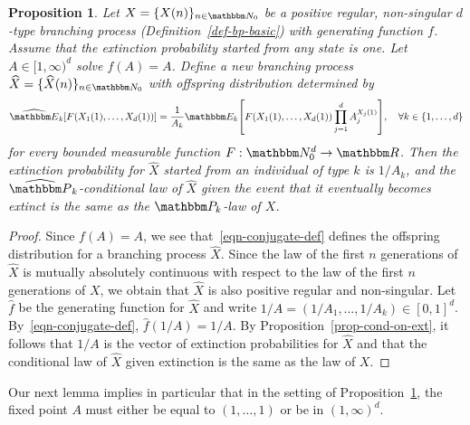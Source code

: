 \documentclass[11pt]{article}
\theoremstyle{plain}
\newtheorem{prop}[thm]{Proposition}
\theoremstyle{definition}
\numberwithin{equation}{section}
\newcommand{\eqb}{\begin{equation}}
\newcommand{\eqe}{\end{equation}}
\newcommand{\BB}{\mathbbm}
\newcommand{\wh}{\widehat}
\let\originalleft\left
\let\originalright\right
\renewcommand{\left}{\mathopen{}\mathclose\bgroup\originalleft}
\renewcommand{\right}{\aftergroup\egroup\originalright}
\begin{document}
\begin{prop} \label{prop-conjugate}
Let $X = \{X(n) \}_{n\in\BB N_0}$ be a positive regular, non-singular $d$-type branching process (Definition~\ref{def-bp-basic}) with generating function $f$. Assume that the extinction probability started from any state is one. 
Let $A \in [1,\infty)^d$ solve $f(A) = A$. Define a new branching process $\wh X = \{\wh X(n)  \}_{n\in\BB N_0}$ with offspring distribution determined by
\eqb \label{eqn-conjugate-def}
\wh{\BB E}_k\left[ F(X_1(1) , \dots, X_d(1))   \right] 
 = \frac{1}{A_k} \BB E_k\left[ F(X_1(1),\dots,X_d(1)) \prod_{j=1}^d A_j^{X_j(1)} \right] ,\quad\forall k\in \{1,\dots,d\}    
\eqe  
for every bounded measurable function $F : \BB N_0^d \to \BB R$. Then the extinction probability for $\wh X$ started from an individual of type $k$ is $1/A_k$, and the $\wh{\BB P}_k$-conditional law of $\wh X$ given the event that it eventually becomes extinct is the same as the $\BB P_k$-law of $X$.
\end{prop}
\begin{proof}
Since $f(A) =A$, we see that~\eqref{eqn-conjugate-def} defines the offspring distribution for a branching process $\wh X$. Since the law of the first $n$ generations of $\wh X$ is mutually absolutely continuous with respect to the law of the first $n$ generations of $X$, we obtain that $\wh X$ is also positive regular and non-singular. 
Let $\wh f  $ be the generating function for $\wh X$ and write $1/A = (1/A_1,\dots,1/A_k) \in [0,1]^d$. By~\eqref{eqn-conjugate-def}, $\wh f(1/A) = 1/A$. By Proposition~\ref{prop-cond-on-ext}, it follows that $1/A$ is the vector of extinction probabilities for $\wh X$ and that the conditional law of $\wh X$ given extinction is the same as the law of $X$. 
\end{proof}
 
 
 
 
Our next lemma implies in particular that in the setting of Proposition~\ref{prop-conjugate}, the fixed point $A$ must either be equal to $(1,\dots,1)$ or be in $(1,\infty)^d$. 
\end{document}
